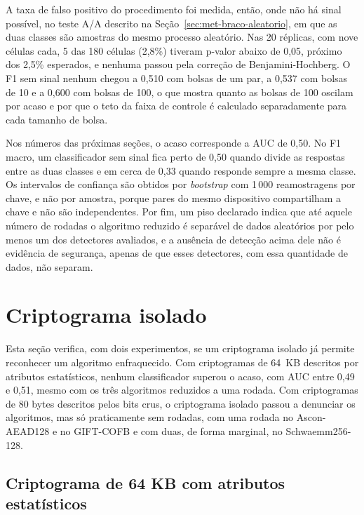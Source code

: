 A taxa de falso positivo do procedimento foi medida, então, onde não há sinal possível, no teste A/A descrito na Seção~\ref{sec:met-braco-aleatorio}, em que as duas classes são amostras do mesmo processo aleatório. Nas 20 réplicas, com nove células cada, 5 das 180 células (2,8\%) tiveram p-valor abaixo de 0,05, próximo dos 2,5\% esperados, e nenhuma passou pela correção de Benjamini-Hochberg. O F1 sem sinal nenhum chegou a 0,510 com bolsas de um par, a 0,537 com bolsas de 10 e a 0,600 com bolsas de 100, o que mostra quanto as bolsas de 100 oscilam por acaso e por que o teto da faixa de controle é calculado separadamente para cada tamanho de bolsa.

Nos números das próximas seções, o acaso corresponde a AUC de 0,50. No F1 macro, um classificador sem sinal fica perto de 0,50 quando divide as respostas entre as duas classes e em cerca de 0,33 quando responde sempre a mesma classe. Os intervalos de confiança são obtidos por \textit{bootstrap} com 1\,000 reamostragens por chave, e não por amostra, porque pares do mesmo dispositivo compartilham a chave e não são independentes. Por fim, um piso declarado indica que até aquele número de rodadas o algoritmo reduzido é separável de dados aleatórios por pelo menos um dos detectores avaliados, e a ausência de detecção acima dele não é evidência de segurança, apenas de que esses detectores, com essa quantidade de dados, não separam.

\section{Criptograma isolado}
\label{sec:res-isolado}

Esta seção verifica, com dois experimentos, se um criptograma isolado já permite reconhecer um algoritmo enfraquecido. Com criptogramas de 64~KB descritos por atributos estatísticos, nenhum classificador superou o acaso, com AUC entre 0,49 e 0,51, mesmo com os três algoritmos reduzidos a uma rodada. Com criptogramas de 80 bytes descritos pelos bits crus, o criptograma isolado passou a denunciar os algoritmos, mas só praticamente sem rodadas, com uma rodada no Ascon-AEAD128 e no GIFT-COFB e com duas, de forma marginal, no Schwaemm256-128.

\subsection{Criptograma de 64 KB com atributos estatísticos}
\label{sec:res-isolado-64k}

